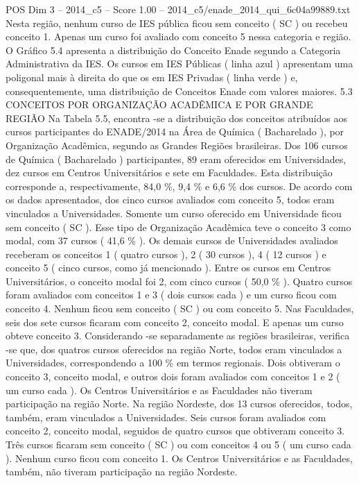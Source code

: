\begin{textsample}{POS Dim 3 – 2014\_c5 – Score 1.00 – 2014\_c5/enade\_2014\_qui\_6c04a99889.txt}
Nesta região, nenhum curso de IES pública ficou sem conceito ( SC ) ou recebeu conceito 1.
Apenas um curso foi avaliado com conceito 5 nessa categoria e região.
O Gráfico 5.4 apresenta a distribuição do Conceito Enade segundo a Categoria Administrativa da IES.
Os cursos em IES Públicas ( linha azul ) apresentam uma poligonal mais à direita do que os em IES Privadas ( linha verde ) e, consequentemente, uma distribuição de Conceitos Enade com valores maiores. 5.3 CONCEITOS POR ORGANIZAÇÃO ACADÊMICA E POR GRANDE REGIÃO Na Tabela 5.5, encontra -se a distribuição dos conceitos atribuídos aos cursos participantes do ENADE/2014 na Área de Química ( Bacharelado ), por Organização Acadêmica, segundo as Grandes Regiões brasileiras.
Dos 106 cursos de Química ( Bacharelado ) participantes, 89 eram oferecidos em Universidades, dez cursos em Centros Universitários e sete em Faculdades.
Esta distribuição corresponde a, respectivamente, 84,0 \%, 9,4 \% e 6,6 \% dos cursos.
De acordo com os dados apresentados, dos cinco cursos avaliados com conceito 5, todos eram vinculados a Universidades.
Somente um curso oferecido em Universidade ficou sem conceito ( SC ).
Esse tipo de Organização Acadêmica teve o conceito 3 como modal, com 37 cursos ( 41,6 \% ).
Os demais cursos de Universidades avaliados receberam os conceitos 1 ( quatro cursos ), 2 ( 30 cursos ), 4 ( 12 cursos ) e conceito 5 ( cinco cursos, como já mencionado ).
Entre os cursos em Centros Universitários, o conceito modal foi 2, com cinco cursos ( 50,0 \% ).
Quatro cursos foram avaliados com conceitos 1 e 3 ( dois cursos cada ) e um curso ficou com conceito 4.
Nenhum ficou sem conceito ( SC ) ou com conceito 5.
Nas Faculdades, seis dos sete cursos ficaram com conceito 2, conceito modal.
E apenas um curso obteve conceito 3.
Considerando -se separadamente as regiões brasileiras, verifica -se que, dos quatros cursos oferecidos na região Norte, todos eram vinculados a Universidades, correspondendo a 100 \% em termos regionais.
Dois obtiveram o conceito 3, conceito modal, e outros dois foram avaliados com conceitos 1 e 2 ( um curso cada ).
Os Centros Universitários e as Faculdades não tiveram participação na região Norte.
Na região Nordeste, dos 13 cursos oferecidos, todos, também, eram vinculados a Universidades.
Seis cursos foram avaliados com conceito 2, conceito modal, seguidos de quatro cursos que obtiveram conceito 3.
Três cursos ficaram sem conceito ( SC ) ou com conceitos 4 ou 5 ( um curso cada ).
Nenhum curso ficou com conceito 1.
Os Centros Universitários e as Faculdades, também, não tiveram participação na região Nordeste.

\end{textsample}
